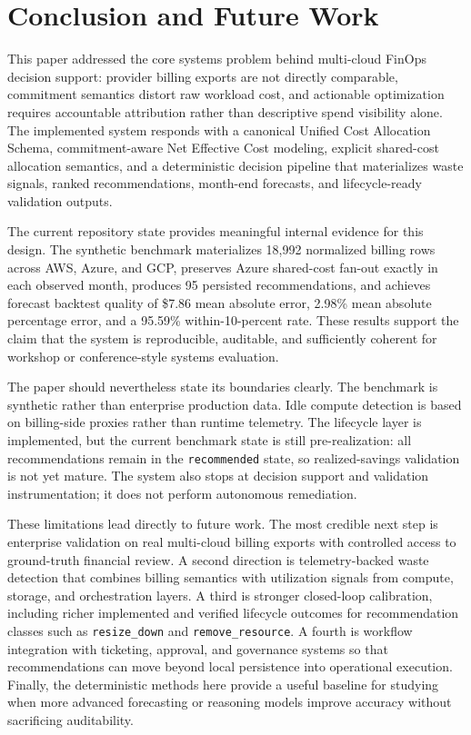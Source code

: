 \section{Conclusion and Future Work}
\label{sec:conclusion}

This paper addressed the core systems problem behind multi-cloud FinOps decision support: provider billing exports are not directly comparable, commitment semantics distort raw workload cost, and actionable optimization requires accountable attribution rather than descriptive spend visibility alone. The implemented system responds with a canonical Unified Cost Allocation Schema, commitment-aware Net Effective Cost modeling, explicit shared-cost allocation semantics, and a deterministic decision pipeline that materializes waste signals, ranked recommendations, month-end forecasts, and lifecycle-ready validation outputs.

The current repository state provides meaningful internal evidence for this design. The synthetic benchmark materializes 18{,}992 normalized billing rows across AWS, Azure, and GCP, preserves Azure shared-cost fan-out exactly in each observed month, produces 95 persisted recommendations, and achieves forecast backtest quality of \$7.86 mean absolute error, 2.98\% mean absolute percentage error, and a 95.59\% within-10-percent rate. These results support the claim that the system is reproducible, auditable, and sufficiently coherent for workshop or conference-style systems evaluation.

The paper should nevertheless state its boundaries clearly. The benchmark is synthetic rather than enterprise production data. Idle compute detection is based on billing-side proxies rather than runtime telemetry. The lifecycle layer is implemented, but the current benchmark state is still pre-realization: all recommendations remain in the \texttt{recommended} state, so realized-savings validation is not yet mature. The system also stops at decision support and validation instrumentation; it does not perform autonomous remediation.

These limitations lead directly to future work. The most credible next step is enterprise validation on real multi-cloud billing exports with controlled access to ground-truth financial review. A second direction is telemetry-backed waste detection that combines billing semantics with utilization signals from compute, storage, and orchestration layers. A third is stronger closed-loop calibration, including richer implemented and verified lifecycle outcomes for recommendation classes such as \texttt{resize\_down} and \texttt{remove\_resource}. A fourth is workflow integration with ticketing, approval, and governance systems so that recommendations can move beyond local persistence into operational execution. Finally, the deterministic methods here provide a useful baseline for studying when more advanced forecasting or reasoning models improve accuracy without sacrificing auditability.
